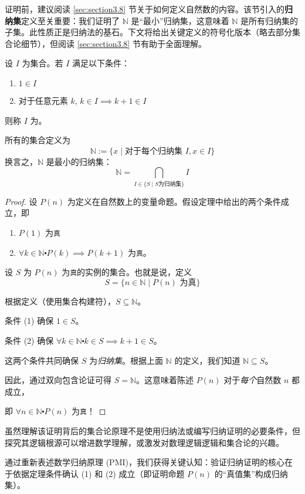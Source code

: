 证明前，建议阅读 \ref{sec:section3.8} 节关于如何定义自然数的内容。该节引入的\textbf{归纳集}定义至关重要：我们证明了 $\mathbb{N}$ 是``最小''归纳集，这意味着 $\mathbb{N}$ 是所有归纳集的子集。此性质正是归纳法的基石。下文将给出关键定义的符号化版本（略去部分集合论细节），但阅读 \ref{sec:section3.8} 节有助于全面理解。

\begin{definition}
    设 $I$ 为集合。若 $I$ 满足以下条件：
    \begin{enumerate}
        \item $1 \in I$
        \item 对于任意元素 $k$, $k \in I \implies k + 1 \in I$
    \end{enumerate}
    则称 $I$ 为。
\end{definition}

\begin{definition}
    所有的集合定义为
    \[\mathbb{N}:=\{x \mid \text{对于每个归纳集\ }I, x \in I\}\]
    换言之，$\mathbb{N}$ 是最小的归纳集：
    \[\mathbb{N} = \bigcap_{I \in \{S \mid S \text{为归纳集}\}} I\] 
\end{definition}

\begin{proof}
    设 $P(n)$ 为定义在自然数上的变量命题。假设定理中给出的两个条件成立，即
    \begin{enumerate}[label=(\arabic*)]
        \item $P(1)$ 为\verb|真|
        \item $\forall k \in \mathbb{N} \centerdot P(k) \implies P(k+1)$ 为\verb|真|。
    \end{enumerate}

    设 $S$ 为 $P(n)$ 为\verb|真|的实例的集合。也就是说，定义
    \[S = \{n \in \mathbb{N} \mid P(n) \text{\ 为真}\}\]

    根据定义（使用集合构建符），$S \subseteq \mathbb{N}$。

    条件 (1) 确保 $1 \in S$。

    条件 (2) 确保 $\forall k \in \mathbb{N} \centerdot k \in S \implies k+1 \in S$。

    这两个条件共同确保 $S$ 为\emph{归纳集}。根据上面 $\mathbb{N}$ 的定义，我们知道 $\mathbb{N} \subseteq S$。

    因此，通过双向包含论证可得 $S = \mathbb{N}$。这意味着陈述 $P(n)$ 对于\emph{每个}自然数 $n$ 都成立，
    
    即 $\forall n \in \mathbb{N} \centerdot P(n)$ 为\verb|真|！
\end{proof}

虽然理解该证明背后的集合论原理不是使用归纳法或编写归纳证明的必要条件，但探究其逻辑根源可以增进数学理解，或激发对数理逻辑逻辑和集合论的兴趣。

通过重新表述数学归纳原理 (PMI)，我们获得关键认知：验证归纳证明的核心在于依据定理条件确认 (1) 和 (2) 成立（即证明命题 $P(n)$ 的``真值集''构成归纳集）。
